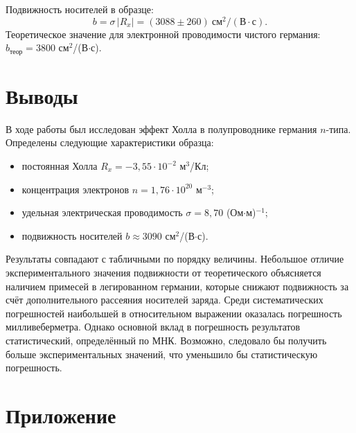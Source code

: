 \documentclass{article}
\begin{document}
Подвижность носителей в образце:
\begin{equation}
	b = \sigma\,|R_x| = (3088 \pm 260)\ \text{см}^2/(\text{В}\cdot\text{с}).
\end{equation}
Теоретическое значение для электронной проводимости чистого германия: $b_{\text{теор}} = 3800$ см$^2$/(В$\cdot$с).
	
\section{Выводы}

В ходе работы был исследован эффект Холла в полупроводнике германия $n$-типа. Определены следующие характеристики образца:
\begin{itemize}
	\item постоянная Холла $R_x = -3{,}55\cdot 10^{-2}$ м$^3$/Кл;
	\item концентрация электронов $n = 1{,}76\cdot 10^{20}$ м$^{-3}$;
	\item удельная электрическая проводимость $\sigma = 8{,}70$ (Ом$\cdot$м)$^{-1}$;
	\item подвижность носителей $b \approx 3090$ см$^2$/(В$\cdot$с).
\end{itemize}

Результаты совпадают с табличными по порядку величины. Небольшое отличие экспериментального значения подвижности от теоретического объясняется наличием примесей в легированном германии, которые снижают подвижность за счёт дополнительного рассеяния носителей заряда. Среди систематических погрешностей наибольшей в относительном выражении оказалась погрешность милливеберметра. Однако основной вклад в погрешность результатов статистический, определённый по МНК. Возможно, следовало бы получить больше экспериментальных значений, что уменьшило бы статистическую погрешность.

\section{Приложение}
\end{document}
